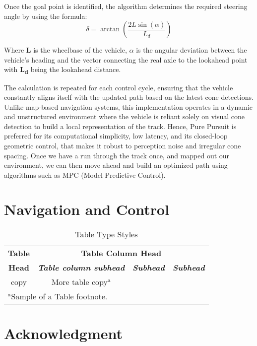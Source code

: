 \documentclass[conference]{IEEEtran}
\begin{document}
Once the goal point is identified, the algorithm determines the required steering angle by using the formula:
\begin{equation}
\delta = \arctan\left(\frac{2L \sin(\alpha)}{L_d}\right)
\end{equation}

Where \textbf{L} is the wheelbase of the vehicle, $\alpha$ is the angular deviation between the vehicle's heading and the vector connecting the real axle to the lookahead point with \textbf{L\textsubscript{d}} being the lookahead distance.

The calculation is repeated for each control cycle, ensuring that the vehicle constantly aligns itself with the updated path based on the latest cone detections. Unlike map-based navigation systems, this implementation operates in a dynamic and unstructured environment where the vehicle is reliant solely on visual cone detection to build a local representation of the track. Hence, Pure Pursuit is preferred for its computational simplicity, low latency, and its closed-loop geometric control, that makes it robust to perception noise and irregular cone spacing. Once we have a run through the track once, and mapped out our environment, we can then move ahead and build an optimized path using algorithms such as MPC (Model Predictive Control).

\section{Navigation and Control}

\begin{table}[htbp]
\caption{Table Type Styles}
\begin{center}
\begin{tabular}{|c|c|c|c|}
\hline
\textbf{Table}&\multicolumn{3}{|c|}{\textbf{Table Column Head}} \\
\cline{2-4} 
\textbf{Head} & \textbf{\textit{Table column subhead}}& \textbf{\textit{Subhead}}& \textbf{\textit{Subhead}} \\
\hline
copy& More table copy$^{\mathrm{a}}$& &  \\
\hline
\multicolumn{4}{l}{$^{\mathrm{a}}$Sample of a Table footnote.}
\end{tabular}
\label{tab1}
\end{center}
\end{table}

\section*{Acknowledgment}
\end{document}
